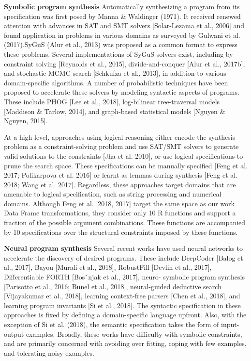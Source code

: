 \documentclass{article}
\begin{document}
\textbf{Symbolic program synthesis} 
Automatically synthesizing a program from its specification was first posed by Manna \& Waldinger (1971). It received renewed attention with advances in SAT and SMT solvers [Solar-Lezama et al., 2006] and found application in problems in various domains as surveyed by Gulwani et al. (2017).SyGuS (Alur et al., 2013) was proposed as a common format to express these problems. Several implementations of SyGuS solvers exist, including by constraint solving [Reynolds et al., 2015], divide-and-conquer [Alur et al., 2017b], and stochastic MCMC search [Schkufza et al., 2013], in addition to various domain-specific algorithms. A number of probabilistic techniques have been proposed to accelerate these solvers by modeling syntactic aspects of programs. These include PHOG [Lee et al., 2018], log-bilinear tree-traversal models [Maddison \& Tarlow, 2014], and graph-based statistical models [Nguyen \& Nguyen, 2015].

At a high-level, approaches using logical reasoning either encode the synthesis problem as a constraint-solving problem and use SAT/SMT solvers to generate valid solutions to the constraints [Jha et al. 2010], or use logical specifications to prune the search space. These specifications can be manually specified [Feng et al. 2017; Polikarpova et al. 2016] or learnt as lemmas during synthesis [Feng et al. 2018; Wang et al. 2017]. Regardless, these approaches target domains that are amenable to logical specification, such as string processing and numerical domains. Although Feng et al. [2018, 2017] target the same space as our work Data Frame transformations, they consider only 10 R functions and support a fraction of the possible argument combinations. These functions are accompanied by 10 specifications over the structural constraints imposed by these functions.

\textbf{Neural program synthesis}
Several recent works have used neural networks to accelerate the discovery of desired programs. These include DeepCoder [Balog et al., 2017], Bayou [Murali et al., 2018], RobustFill [Devlin et al., 2017], Differentiable FORTH [Bosˇnjak et al., 2017], neuro- symbolic program synthesis [Parisotto et al., 2016; Bunel et al., 2018], neural-guided deductive search [Vijayakumar et al., 2018], learning context-free parsers [Chen et al., 2018], and learning program invariants [Si et al., 2018]. The syntactic specification in these approaches is fixed by defining a domain-specific language upfront. Also, with the exception of Si et al. (2018), the semantic specification takes the form of input-output examples. Broadly, these works have difficulty with symbolic constraints, and are primarily concerned with avoiding over fitting, coping with few examples, and tolerating noisy examples.
\end{document}
